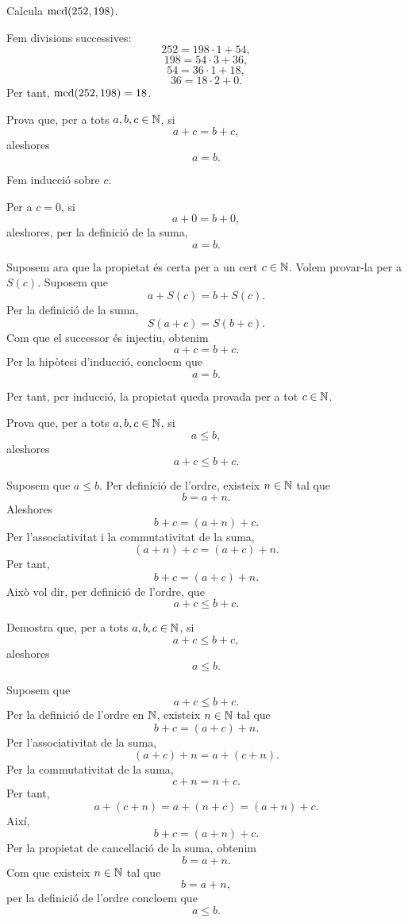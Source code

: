 \begin{exercici}
Calcula \(\operatorname{mcd}(252,198)\).
\end{exercici}

\begin{solucio}
Fem divisions successives:
\[
252=198\cdot1+54,
\]
\[
198=54\cdot3+36,
\]
\[
54=36\cdot1+18,
\]
\[
36=18\cdot2+0.
\]
Per tant, \(\operatorname{mcd}(252,198)=18\).
\end{solucio}



\begin{exercici}
Prova que, per a tots \(a,b,c\in\mathbb{N}\), si
\[
a+c=b+c,
\]
aleshores
\[
a=b.
\]
\end{exercici}

\begin{solucio}
Fem inducció sobre \(c\).

Per a \(c=0\), si
\[
a+0=b+0,
\]
aleshores, per la definició de la suma,
\[
a=b.
\]

Suposem ara que la propietat és certa per a un cert \(c\in\mathbb{N}\). Volem provar-la per a \(S(c)\). Suposem que
\[
a+S(c)=b+S(c).
\]
Per la definició de la suma,
\[
S(a+c)=S(b+c).
\]
Com que el successor és injectiu, obtenim
\[
a+c=b+c.
\]
Per la hipòtesi d'inducció, concloem que
\[
a=b.
\]

Per tant, per inducció, la propietat queda provada per a tot \(c\in\mathbb{N}\).
\end{solucio}

\begin{exercici}
Prova que, per a tots \(a,b,c\in\mathbb{N}\), si
\[
a\leq b,
\]
aleshores
\[
a+c\leq b+c.
\]
\end{exercici}

\begin{solucio}
Suposem que \(a\leq b\). Per definició de l'ordre, existeix \(n\in\mathbb{N}\) tal que
\[
b=a+n.
\]
Aleshores
\[
b+c=(a+n)+c.
\]
Per l'associativitat i la commutativitat de la suma,
\[
(a+n)+c=(a+c)+n.
\]
Per tant,
\[
b+c=(a+c)+n.
\]
Això vol dir, per definició de l'ordre, que
\[
a+c\leq b+c.
\]
\end{solucio}

\begin{exercici}\label{ex:cancelacio-ordre-suma}
Demostra que, per a tots $a,b,c\in\mathbb{N}$, si
\[
a+c\leq b+c,
\]
aleshores
\[
a\leq b.
\]
\end{exercici}

\begin{solucio}
Suposem que
\[
a+c\leq b+c.
\]
Per la definició de l'ordre en $\mathbb{N}$, existeix $n\in\mathbb{N}$ tal que
\[
b+c=(a+c)+n.
\]
Per l'associativitat de la suma,
\[
(a+c)+n=a+(c+n).
\]
Per la commutativitat de la suma,
\[
c+n=n+c.
\]
Per tant,
\[
a+(c+n)=a+(n+c)=(a+n)+c.
\]
Així,
\[
b+c=(a+n)+c.
\]
Per la propietat de cancel\textperiodcentered{}lació de la suma, obtenim
\[
b=a+n.
\]
Com que existeix $n\in\mathbb{N}$ tal que
\[
b=a+n,
\]
per la definició de l'ordre concloem que
\[
a\leq b.
\]
\end{solucio}

